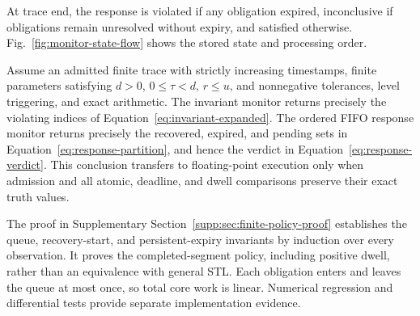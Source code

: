 At trace end, the response is violated if any obligation expired, inconclusive if obligations remain unresolved without expiry, and satisfied otherwise. Fig.~\ref{fig:monitor-state-flow} shows the stored state and processing order.

\begin{proposition}
\label{prop:finite-policy-consistency}
Assume an admitted finite trace with strictly increasing timestamps, finite parameters satisfying $d>0$, $0\leq\tau<d$, $r\leq u$, and nonnegative tolerances, level triggering, and exact arithmetic. The invariant monitor returns precisely the violating indices of Equation~\eqref{eq:invariant-expanded}. The ordered FIFO response monitor returns precisely the recovered, expired, and pending sets in Equation~\eqref{eq:response-partition}, and hence the verdict in Equation~\eqref{eq:response-verdict}. This conclusion transfers to floating-point execution only when admission and all atomic, deadline, and dwell comparisons preserve their exact truth values.
\end{proposition}

The proof in Supplementary Section~\ref{supp:sec:finite-policy-proof} establishes the queue, recovery-start, and persistent-expiry invariants by induction over every observation. It proves the completed-segment policy, including positive dwell, rather than an equivalence with general STL. Each obligation enters and leaves the queue at most once, so total core work is linear. Numerical regression and differential tests provide separate implementation evidence.
